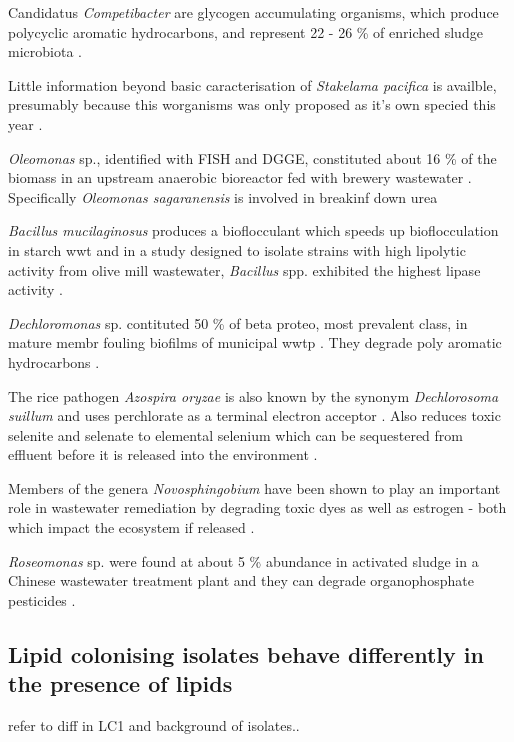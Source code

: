 \documentclass[11pt]{article}
\begin{document}
Candidatus \emph{Competibacter} are glycogen accumulating organisms, which produce polycyclic aromatic hydrocarbons, and represent 22 - 26 \% of enriched sludge microbiota \cite{bengtsson2008production,lemaire2008microbial}. 

Little information beyond basic caracterisation of \emph{Stakelama pacifica} is availble, presumably because this worganisms was only proposed as it's own specied this year \cite{ogler2013description}.

\emph{Oleomonas} sp., identified with FISH and DGGE, constituted about 16 \% of the biomass in an upstream anaerobic bioreactor fed with brewery wastewater \cite{fernandez2008analysis}. Specifically \emph{Oleomonas sagaranensis} is involved in breakinf down urea \cite{kanamori2005allophanate,kanamori2004enzymatic}

\emph{Bacillus mucilaginosus} produces a bioflocculant which speeds up bioflocculation in starch wwt \cite{deng2003characteristics} and in a study designed to isolate strains with high lipolytic activity from olive mill wastewater, \emph{Bacillus} spp. exhibited the highest lipase activity \cite{ertuugrul2007isolation}.

\emph{Dechloromonas} sp. contituted 50 \% of beta proteo, most prevalent class,  in mature membr fouling biofilms of municipal wwtp \cite{miura2007membrane}. They degrade poly aromatic hydrocarbons \cite{oshiki2008pha}.

The rice pathogen \emph{Azospira oryzae} is also known by the synonym \emph{Dechlorosoma suillum} and uses perchlorate as a terminal electron acceptor  \cite{reinhold2000reassessment,tan2003dechlorosoma}. Also reduces toxic selenite and selenate to elemental selenium which can be sequestered from effluent before it is released into the environment \cite{hunter2007azospira,wilhelmus2013microbiological}.

Members of the genera \emph{Novosphingobium} have been shown to play an important role in wastewater remediation by degrading toxic dyes as well as estrogen - both which impact the ecosystem if released \cite{addison2007novosphingobium,hashimoto2009contribution}.

\emph{Roseomonas} sp. were found at about 5 \% abundance in activated sludge in a Chinese wastewater treatment plant and they can degrade organophosphate pesticides \cite{jiang2008bacterial,jiang2006isolation}.


 
\subsection{Lipid colonising isolates behave differently in the presence of lipids}
refer to diff in LC1 and background of isolates.. 
\end{document}

